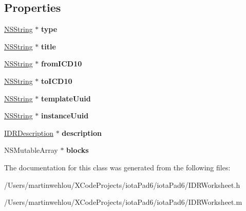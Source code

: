 \subsection*{Properties}
\begin{DoxyCompactItemize}
\item 
\hypertarget{interface_i_d_r_worksheet_a46cca2008e50f90269e582e5f59de273}{
\hyperlink{class_n_s_string}{NSString} $\ast$ {\bfseries type}}
\label{interface_i_d_r_worksheet_a46cca2008e50f90269e582e5f59de273}

\item 
\hypertarget{interface_i_d_r_worksheet_a0e1f8f6f118b2fb721d587b3bbe46f71}{
\hyperlink{class_n_s_string}{NSString} $\ast$ {\bfseries title}}
\label{interface_i_d_r_worksheet_a0e1f8f6f118b2fb721d587b3bbe46f71}

\item 
\hypertarget{interface_i_d_r_worksheet_a949092ebed37c42009ec369d83ca4d05}{
\hyperlink{class_n_s_string}{NSString} $\ast$ {\bfseries fromICD10}}
\label{interface_i_d_r_worksheet_a949092ebed37c42009ec369d83ca4d05}

\item 
\hypertarget{interface_i_d_r_worksheet_af6facf2e8ccf4776df3e928d9000c791}{
\hyperlink{class_n_s_string}{NSString} $\ast$ {\bfseries toICD10}}
\label{interface_i_d_r_worksheet_af6facf2e8ccf4776df3e928d9000c791}

\item 
\hypertarget{interface_i_d_r_worksheet_a0c56b7e140772928a8917c349dc3ea9a}{
\hyperlink{class_n_s_string}{NSString} $\ast$ {\bfseries templateUuid}}
\label{interface_i_d_r_worksheet_a0c56b7e140772928a8917c349dc3ea9a}

\item 
\hypertarget{interface_i_d_r_worksheet_a0e15d1dafbd43f1f9dc8c52d4e07eaab}{
\hyperlink{class_n_s_string}{NSString} $\ast$ {\bfseries instanceUuid}}
\label{interface_i_d_r_worksheet_a0e15d1dafbd43f1f9dc8c52d4e07eaab}

\item 
\hypertarget{interface_i_d_r_worksheet_adda309fe8447223bd6aa19a8d2dd4f98}{
\hyperlink{interface_i_d_r_description}{IDRDescription} $\ast$ {\bfseries description}}
\label{interface_i_d_r_worksheet_adda309fe8447223bd6aa19a8d2dd4f98}

\item 
\hypertarget{interface_i_d_r_worksheet_a5f3e46d385224f4b2cfc3a57a85571cb}{
NSMutableArray $\ast$ {\bfseries blocks}}
\label{interface_i_d_r_worksheet_a5f3e46d385224f4b2cfc3a57a85571cb}

\end{DoxyCompactItemize}


The documentation for this class was generated from the following files:\begin{DoxyCompactItemize}
\item 
/Users/martinwehlou/XCodeProjects/iotaPad6/iotaPad6/IDRWorksheet.h\item 
/Users/martinwehlou/XCodeProjects/iotaPad6/iotaPad6/IDRWorksheet.m\end{DoxyCompactItemize}
